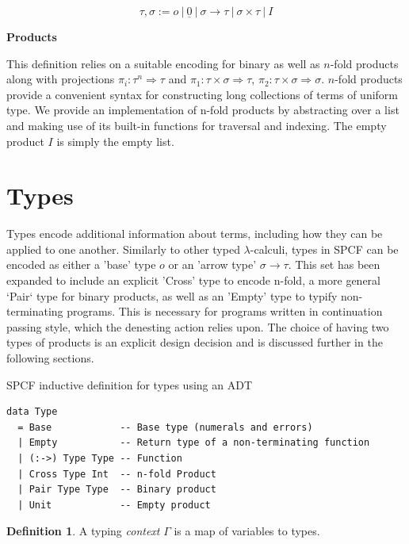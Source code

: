 \documentclass[12pt,a4paper]{report}
\theoremstyle{definition}
\theoremstyle{definition}
\newtheorem{definition}{Definition}[chapter]%
\theoremstyle{remark}
\begin{document}
\begin{equation}
    \tau , \sigma := o\ |\ \underline{0}\ |\ \sigma \rightarrow \tau\ |\ \sigma \times \tau\ |\ I
\end{equation}

\textbf{Products}

This definition relies on a suitable encoding for binary as well as $n$-fold products along with projections $\pi_i : \tau^n \Rightarrow \tau$ and $\pi_1 : \tau \times \sigma \Rightarrow \tau$, $\pi_2 : \tau \times \sigma \Rightarrow \sigma$. $n$-fold products provide a convenient syntax for constructing long collections of terms of uniform type. We provide an implementation of n-fold products by abstracting over a list and making use of its built-in functions for traversal and indexing. The empty product $I$ is simply the empty list.

\section{Types}\label{section: typing}
Types encode additional information about terms, including how they can be applied to one another. Similarly to other typed $\lambda$-calculi, types in SPCF can be encoded as either a 'base' type $o$ or an 'arrow type' $\sigma \rightarrow \tau$. This set has been expanded to include an explicit 'Cross' type to encode n-fold, a more general `Pair` type for binary products, as well as an 'Empty' type to typify non-terminating programs. This is necessary for programs written in continuation passing style, which the denesting action relies upon. The choice of having two types of products is an explicit design decision and is discussed further in the following sections. 

\begin{listing}
\caption{SPCF inductive definition for types using an ADT}
\begin{verbatim}
data Type
  = Base            -- Base type (numerals and errors)
  | Empty           -- Return type of a non-terminating function
  | (:->) Type Type -- Function
  | Cross Type Int  -- n-fold Product
  | Pair Type Type  -- Binary product
  | Unit            -- Empty product
\end{verbatim}
\label{listing:type-adt}
\end{listing}

\begin{definition}
    A typing \emph{context} $\Gamma$ is a map of variables to types.
\end{definition}
\end{document}
